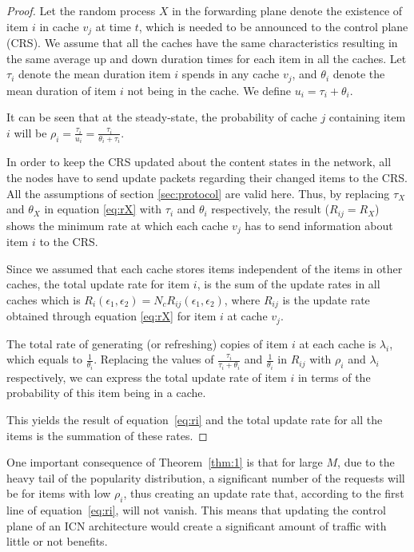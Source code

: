 \documentclass[conference]{IEEEtran}
\theoremstyle{plain}
\theoremstyle{remark}
\begin{document}
\begin{proof}
Let the random process $X$ in the forwarding plane denote the existence of item $i$ in cache $v_j$ at time $t$, which is needed to be announced to the control plane (CRS). We assume that all the caches have the same characteristics resulting in the same average up and down duration times for each item in all the caches. Let $\tau_i$ denote the mean duration item $i$ spends in any cache $v_j$, and $\theta_i$ denote the mean duration of item $i$ not being in the cache. We define $u_i=\tau_i+\theta_i$.

It can be seen that at the steady-state, the probability of cache $j$ containing item $i$ will be $\rho_i=\frac{\tau_i}{u_i}=\frac{\tau_i}{\theta_i+\tau_i}$.

In order to keep the CRS updated about the content states in the network, all the nodes have to send update packets regarding their changed items to the CRS. All the assumptions of section \ref{sec:protocol} are valid here. Thus, by replacing $\tau_X$ and $\theta_X$ in equation \ref{eq:rX} with $\tau_i$ and $\theta_i$ respectively, the result ($R_{ij}=R_X$) shows the minimum rate at which each cache  $v_j$ has to send information about item $i$ to the CRS.
	
Since we assumed that each cache stores items independent of the items in other caches, the total update rate for item $i$, is the sum of the update rates in all caches which is $R_i(\epsilon_1,\epsilon_2)=N_cR_{ij}(\epsilon_1,\epsilon_2)$, where $R_{ij}$ is the update rate obtained through equation \ref{eq:rX} for item $i$ at cache $v_j$.

The total rate of generating (or refreshing) copies of item $i$ at each cache is $\lambda_i$, which equals to $\frac{1}{\theta_i}$.
Replacing the values of $\frac{\tau_i}{\tau_i+\theta_i}$ and $\frac{1}{\theta_i}$ in $R_{ij}$ with $\rho_i$ and $\lambda_i$ respectively, we can express the total update rate of item $i$ in terms of the probability of this item being in a cache.

This yields the result of equation~\ref{eq:ri} and the total update rate for all the items is the summation of these rates.
\end{proof}

One important consequence of Theorem~\ref{thm:1} is that for large $M$, due to the heavy tail of the popularity distribution, a significant number of the requests will be for items with low $\rho_i$, thus creating an update rate that, according to the first line of equation~\ref{eq:ri}, will not vanish. This means that updating the control plane of an ICN architecture would create a significant amount of traffic with little or not benefits.
\end{document}
